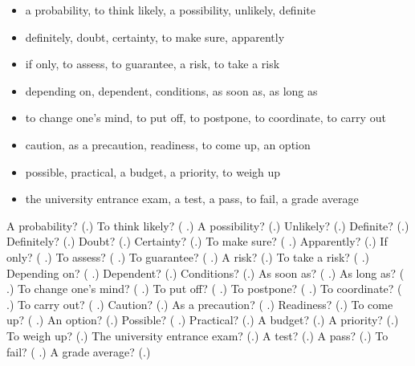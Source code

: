 \begin{itemize}
\raggedright
  \item a probability, to think likely, a possibility, unlikely, definite
  \item definitely, doubt, certainty, to make sure, apparently
  \item if only, to assess, to guarantee, a risk, to take a risk
  \item depending on, dependent, conditions, as soon as, as long as
  \item to change one's mind, to put off, to postpone, to coordinate, to carry out
  \item caution, as a precaution, readiness, to come up, an option
  \item possible, practical, a budget, a priority, to weigh up
  \item the university entrance exam, a test, a pass, to fail, a grade average
\end{itemize}

\begin{tcolorbox}[breakable,colback=teal!4,colframe=teal!35!black,title={Before you move on}]
A probability? (\textbf{}.) To think likely? (\textbf{ }.) A possibility? (\textbf{}.) Unlikely? (\textbf{}.) Definite? (\textbf{}.) Definitely? (\textbf{}.) Doubt? (\textbf{}.) Certainty? (\textbf{}.) To make sure? (\textbf{ }.) Apparently? (\textbf{}.) If only? (\textbf{ }.) To assess? (\textbf{ }.) To guarantee? (\textbf{ }.) A risk? (\textbf{}.) To take a risk? (\textbf{ }.) Depending on? (\textbf{ }.) Dependent? (\textbf{}.) Conditions? (\textbf{}.) As soon as? (\textbf{  }.) As long as? (\textbf{  }.) To change one's mind? (\textbf{ }.) To put off? (\textbf{ }.) To postpone? (\textbf{  }.) To coordinate? (\textbf{ }.) To carry out? (\textbf{ }.) Caution? (\textbf{}.) As a precaution? (\textbf{ }.) Readiness? (\textbf{}.) To come up? (\textbf{ }.) An option? (\textbf{}.) Possible? (\textbf{ }.) Practical? (\textbf{}.) A budget? (\textbf{}.) A priority? (\textbf{}.) To weigh up? (\textbf{}.) The university entrance exam? (\textbf{}.) A test? (\textbf{}.) A pass? (\textbf{}.) To fail? (\textbf{ }.) A grade average? (\textbf{}.)
\end{tcolorbox}
